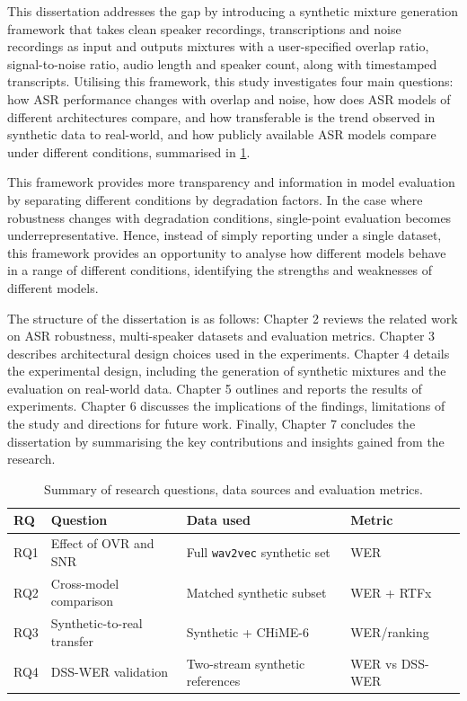 This dissertation addresses the gap by introducing a synthetic mixture generation framework that takes clean speaker recordings, transcriptions and noise recordings as input and outputs mixtures with a user-specified overlap ratio, signal-to-noise ratio, audio length and speaker count, along with timestamped transcripts. Utilising this framework, this study investigates four main questions: how ASR performance changes with overlap and noise, how does ASR models of different architectures compare, and how transferable is the trend observed in synthetic data to real-world, and how publicly available ASR models compare under different conditions, summarised in \cref{tab:research_questions}.

This framework provides more transparency and information in model evaluation by separating different conditions by degradation factors. In the case where robustness changes with degradation conditions, single-point evaluation becomes underrepresentative. Hence, instead of simply reporting under a single dataset, this framework provides an opportunity to analyse how different models behave in a range of different conditions, identifying the strengths and weaknesses of different models.

The structure of the dissertation is as follows: Chapter 2 reviews the related work on ASR robustness, multi-speaker datasets and evaluation metrics. Chapter 3 describes architectural design choices used in the experiments. Chapter 4 details the experimental design, including the generation of synthetic mixtures and the evaluation on real-world data. Chapter 5 outlines and reports the results of experiments. Chapter 6 discusses the implications of the findings, limitations of the study and directions for future work. Finally, Chapter 7 concludes the dissertation by summarising the key contributions and insights gained from the research.

\begin{table}[htbp]
\centering
\caption{Summary of research questions, data sources and evaluation metrics.}
\label{tab:research_questions}
\begin{tabularx}{\textwidth}{lXXX}
\toprule
RQ & Question & Data used & Metric \\
\midrule
RQ1 & Effect of OVR and SNR & Full \texttt{wav2vec} synthetic set & WER \\
RQ2 & Cross-model comparison & Matched synthetic subset & WER + RTFx \\
RQ3 & Synthetic-to-real transfer & Synthetic + CHiME-6 & WER/ranking \\
RQ4 & DSS-WER validation & Two-stream synthetic references & WER vs DSS-WER \\
\bottomrule
\end{tabularx}
\end{table}
